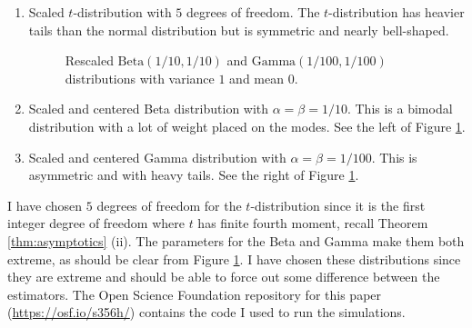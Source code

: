 \documentclass{article}
\theoremstyle{plain}
\theoremstyle{plain}
\theoremstyle{definition}
\theoremstyle{remark}
\theoremstyle{definition}
\theoremstyle{plain}
\theoremstyle{plain}
\theoremstyle{definition}
\begin{document}
\begin{enumerate}
\item Scaled $t$-distribution with $5$ degrees of freedom. The $t$-distribution
has heavier tails than the normal distribution but is symmetric and nearly bell-shaped. 
\begin{figure}
	\centering     %
	\caption{Rescaled $\textrm{Beta}(1/10, 1/10)$ and $\textrm{Gamma}(1/100, 1/100)$ distributions with variance $1$ and mean $0$.}
	\label{fig::distributions}
\end{figure}

\item Scaled and centered Beta distribution with $\alpha=\beta=1/10$. This is a bimodal distribution with a lot of weight placed on the modes. See the left of Figure \ref{fig::distributions}.
\item Scaled and centered Gamma distribution with $\alpha=\beta=1/100$. This is asymmetric and with heavy tails. See the right of Figure \ref{fig::distributions}.
\end{enumerate}

I have chosen $5$ degrees of freedom for the $t$-distribution since it is the first integer degree of freedom where $t$ has finite fourth moment, recall Theorem \ref{thm:asymptotics} (ii). The parameters for the Beta and Gamma make them both extreme, as should be clear from Figure \ref{fig::distributions}. I have chosen these distributions since they are extreme and should be able to force out some difference between the estimators. The Open Science Foundation repository for this paper (\url{https://osf.io/s356h/}) contains the code I used to run the simulations.
\end{document}
